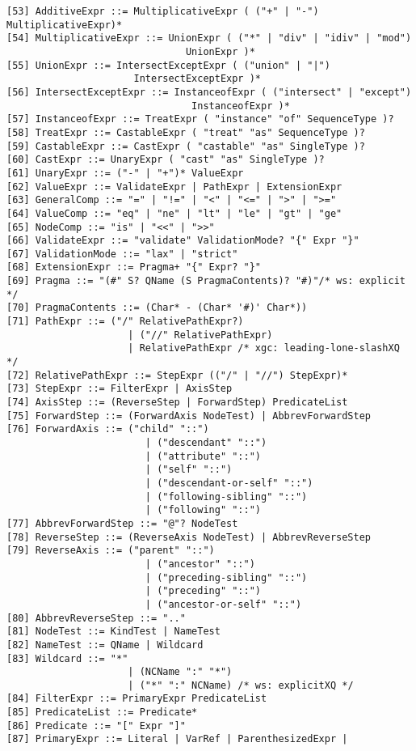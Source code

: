 \begin{verbatim}
[53] AdditiveExpr ::= MultiplicativeExpr ( ("+" | "-") MultiplicativeExpr)*
[54] MultiplicativeExpr ::= UnionExpr ( ("*" | "div" | "idiv" | "mod")
                               UnionExpr )*
[55] UnionExpr ::= IntersectExceptExpr ( ("union" | "|")
                      IntersectExceptExpr )*
[56] IntersectExceptExpr ::= InstanceofExpr ( ("intersect" | "except")
                                InstanceofExpr )*
[57] InstanceofExpr ::= TreatExpr ( "instance" "of" SequenceType )?
[58] TreatExpr ::= CastableExpr ( "treat" "as" SequenceType )?
[59] CastableExpr ::= CastExpr ( "castable" "as" SingleType )?
[60] CastExpr ::= UnaryExpr ( "cast" "as" SingleType )?
[61] UnaryExpr ::= ("-" | "+")* ValueExpr
[62] ValueExpr ::= ValidateExpr | PathExpr | ExtensionExpr
[63] GeneralComp ::= "=" | "!=" | "<" | "<=" | ">" | ">="
[64] ValueComp ::= "eq" | "ne" | "lt" | "le" | "gt" | "ge"
[65] NodeComp ::= "is" | "<<" | ">>"
[66] ValidateExpr ::= "validate" ValidationMode? "{" Expr "}"
[67] ValidationMode ::= "lax" | "strict"
[68] ExtensionExpr ::= Pragma+ "{" Expr? "}"
[69] Pragma ::= "(#" S? QName (S PragmaContents)? "#)"/* ws: explicit */
[70] PragmaContents ::= (Char* - (Char* '#)' Char*))
[71] PathExpr ::= ("/" RelativePathExpr?)
                     | ("//" RelativePathExpr)
                     | RelativePathExpr /* xgc: leading-lone-slashXQ */
[72] RelativePathExpr ::= StepExpr (("/" | "//") StepExpr)*
[73] StepExpr ::= FilterExpr | AxisStep
[74] AxisStep ::= (ReverseStep | ForwardStep) PredicateList
[75] ForwardStep ::= (ForwardAxis NodeTest) | AbbrevForwardStep
[76] ForwardAxis ::= ("child" "::")
                        | ("descendant" "::")
                        | ("attribute" "::")
                        | ("self" "::")  
                        | ("descendant-or-self" "::")
                        | ("following-sibling" "::")
                        | ("following" "::")
[77] AbbrevForwardStep ::= "@"? NodeTest
[78] ReverseStep ::= (ReverseAxis NodeTest) | AbbrevReverseStep
[79] ReverseAxis ::= ("parent" "::")
                        | ("ancestor" "::")
                        | ("preceding-sibling" "::")
                        | ("preceding" "::")
                        | ("ancestor-or-self" "::")
[80] AbbrevReverseStep ::= ".."
[81] NodeTest ::= KindTest | NameTest
[82] NameTest ::= QName | Wildcard
[83] Wildcard ::= "*"
                     | (NCName ":" "*")
                     | ("*" ":" NCName) /* ws: explicitXQ */
[84] FilterExpr ::= PrimaryExpr PredicateList
[85] PredicateList ::= Predicate*
[86] Predicate ::= "[" Expr "]"
[87] PrimaryExpr ::= Literal | VarRef | ParenthesizedExpr |

\end{verbatim}
